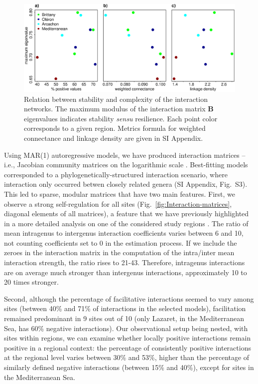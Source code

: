\documentclass[9pt,twocolumn,twoside,lineno]{pnas-new}
\begin{document}
\begin{figure}[!h]
\centering
\includegraphics[width=17.8cm]{complexity_stability_MainFig_pencenjustB}
\caption{Relation between stability and complexity of the interaction
networks. The maximum modulus of the interaction matrix $\mathbf{B}$
eigenvalues indicates stability \emph{sensu} resilience. Each point
color corresponds to a given region. Metrics formula for weighted
connectance and linkage density are given in SI Appendix.}
\label{fig:Stability-community}
\end{figure}

Using MAR(1) autoregressive models, we have produced interaction matrices \cite{ives_estimating_2003,hampton2013quantifying}
-- i.e., Jacobian community matrices on the logarithmic scale \cite{ives_estimating_2003}.
Best-fitting models corresponded to a phylogenetically-structured
interaction scenario, where interaction only occurred betwen closely
related genera (SI Appendix, Fig.~S3). This led to sparse, modular
matrices that have two main features. First, we observe a strong self-regulation
for all sites (Fig.~\ref{fig:Interaction-matrices}, diagonal elements
of all matrices), a feature that we have previously highlighted in
a more detailed analysis on one of the considered study regions \cite{barraquand_coastal_2018}.
The ratio of mean intragenus to intergenus interaction coefficients
varies between 6 and 10, not counting coefficients set to 0 in the
estimation process. If we include the zeroes in the interaction matrix
in the computation of the intra/inter mean interaction strength, the
ratio rises to 21-43. Therefore, intragenus interactions are on average
much stronger than intergenus interactions, approximately 10 to 20
times stronger.

Second, although the percentage of facilitative interactions seemed
to vary among sites (between 40\% and 71\% of interactions in the
selected models), facilitation remained predominant in 9 sites out
of 10 (only Lazaret, in the Mediterranean Sea, has 60\% negative interactions).
Our observational setup being nested, with sites within regions, we
can examine whether locally positive interactions remain positive
in a regional context: the percentage of consistently positive interactions
at the regional level varies between 30\% and 53\%, higher than the
percentage of similarly defined negative interactions (between 15\%
and 40\%), except for sites in the Mediterranean Sea.
\end{document}
